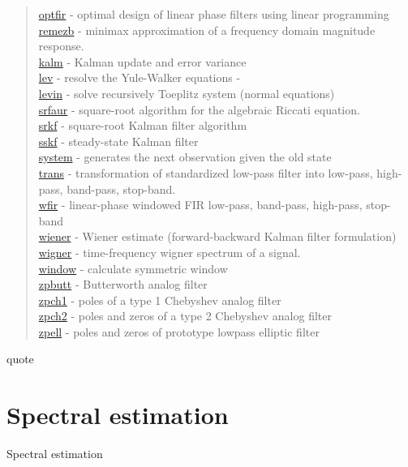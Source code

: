 \begin{quote}
\hyperlink {optfir}{optfir} - optimal design of linear phase filters using linear programming \\
\hyperlink {remezb}{remezb} - minimax approximation of a frequency domain magnitude response. \\
\hyperlink {kalm}{kalm} - Kalman update and error variance \\
\hyperlink {lev}{lev} - resolve the Yule-Walker equations - \\
\hyperlink {levin}{levin} - solve recursively Toeplitz system (normal equations) \\
\hyperlink {srfaur}{srfaur} - square-root algorithm for the algebraic Riccati equation. \\
\hyperlink {srkf}{srkf} - square-root Kalman filter algorithm \\
\hyperlink {sskf}{sskf} - steady-state Kalman filter \\
\hyperlink {system}{system} - generates the next observation given the old state \\
\hyperlink {trans}{trans} - transformation of standardized low-pass filter into low-pass, high-pass, band-pass, stop-band. \\
\hyperlink {wfir}{wfir} - linear-phase windowed FIR low-pass, band-pass, high-pass, stop-band \\
\hyperlink {wiener}{wiener} - Wiener estimate (forward-backward Kalman filter formulation) \\
\hyperlink {wigner}{wigner} - time-frequency wigner spectrum of a signal. \\
\hyperlink {window}{window} - calculate symmetric window \\
\hyperlink {zpbutt}{zpbutt} - Butterworth analog filter \\
\hyperlink {zpch1}{zpch1} - poles of a type 1 Chebyshev analog filter \\
\hyperlink {zpch2}{zpch2} - poles and zeros of a type 2 Chebyshev analog filter \\
\hyperlink {zpell}{zpell} - poles and zeros of prototype lowpass elliptic filter
\end{quote}{quote}

\section{Spectral estimation}{Spectral estimation}

